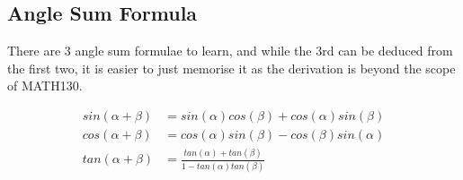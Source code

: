 \subsection{Angle Sum Formula}
\label{sec:AngleSumFormula}

There are 3 angle sum formulae to learn, and while the 3rd can be deduced from
the first two, it is easier to just memorise it as the derivation is beyond
the scope of MATH130.

\begin{align}
  sin(\alpha + \beta) & = sin(\alpha)cos(\beta) + cos(\alpha)sin(\beta) \\
  cos(\alpha + \beta) & = cos(\alpha)sin(\beta) - cos(\beta)sin(\alpha) \\
  tan(\alpha + \beta) & = \frac{tan(\alpha) + tan(\beta)}{1 - tan(\alpha)tan(\beta)}
\end{align}
